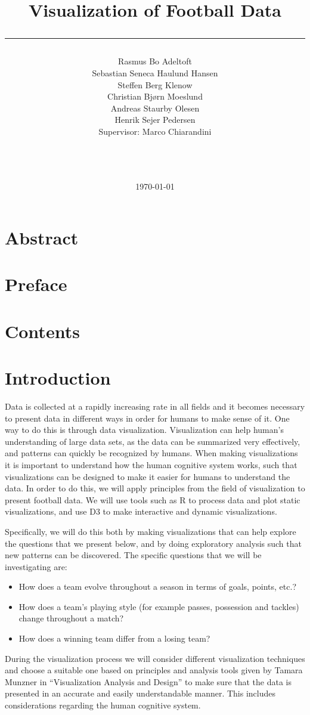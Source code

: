 \documentclass[a4paper,12pt]{article}
\title{Visualization of Football Data\\\rule{10cm}{0.5mm}}
\author{Rasmus Bo Adeltoft\\Sebastian Seneca Haulund Hansen\\Steffen Berg Klenow\\Christian Bjørn Moeslund\\Andreas Staurby Olesen\\Henrik Sejer Pedersen
\\Supervisor: Marco Chiarandini\\\rule{5.5cm}{0.5mm}\\}
\date{\today}
\begin{document}
\maketitle
\newpage
\section{Abstract}

\section{Preface}

\section{Contents}
\tableofcontents

\section{Introduction}
Data is collected at a rapidly increasing rate in all fields and it becomes necessary to present data in different ways in order for humans to make sense of
it. One way to do this is through data visualization. Visualization can help
human's understanding of large data sets, as the data can be summarized very
effectively, and patterns can quickly be recognized by humans. When making
visualizations it is important to understand how the human cognitive system
works, such that visualizations can be designed to make it easier for humans to
understand the data. In order to do this, we will apply principles from the field
of visualization to present football data. We will use tools such as R to process
data and plot static visualizations, and use D3 to make interactive and dynamic
visualizations.

Specifically, we will do this both by making visualizations that can help explore
the questions that we present below, and by doing exploratory analysis such
that new patterns can be discovered. The specific questions that we will be
investigating are:
\begin{itemize}
\item How does a team evolve throughout a season in terms of goals, points,
etc.?
\item How does a team’s playing style (for example passes, possession and tackles)
change throughout a match?
\item How does a winning team differ from a losing team?
\end{itemize}
During the visualization process we will consider different visualization techniques
and choose a suitable one based on principles and analysis tools given
by Tamara Munzner in “Visualization Analysis and Design” to make sure that
the data is presented in an accurate and easily understandable manner. This
includes considerations regarding the human cognitive system.
\end{document}
